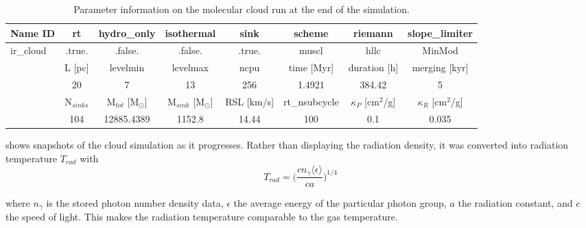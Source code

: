 \begin{table}[!htb]
\begin{adjustbox}{width=\textwidth}
\begin{tabular}{lccccccc}
\toprule
Name ID & rt & hydro\_only & isothermal & sink & scheme & riemann & slope\_limiter \\
\midrule
ir\_cloud & .true. & .false. & .false. & .true. & muscl & hllc & MinMod \\
\bottomrule
\toprule
\quad  & L [pc] & levelmin & levelmax & ncpu & time [Myr] & duration [h] & merging [kyr] \\
\midrule
\quad & 20 & 7 & 13 & 256 & 1.4921 & 384.42 & 5 \\
\bottomrule
\toprule
\quad & N$_{sinks}$ & M$_{tot}$ [M$_{\odot}$] & M$_{sink}$ [M$_{\odot}$] & RSL [km/s] & rt\_nsubcycle & $\kappa_{P}$ [cm$^{2}$/g] & $\kappa_{R}$ [cm$^{2}$/g] \\
\midrule
\quad & 104 & 12885.4389 & 1152.8 & 14.44 & 100 & 0.1 & 0.035 \\
\bottomrule
\end{tabular}
\end{adjustbox}
\captionsetup{justification=justified,singlelinecheck=false,width=\linewidth}
\caption[Cloud simulation parameter info]{Parameter information on the molecular cloud run at the end of the simulation.}
\label{tab:cloud}
\end{table}
\FloatBarrier

 shows snapshots of the cloud simulation as it progresses.
Rather than displaying the radiation density, it was converted into radiation temperature $T_{rad}$ with
\begin{equation}
  T_{rad} = \Big(\frac{c n_{\gamma} \langle \epsilon \rangle}{c a}\Big)^{1/4}
\end{equation}

where $n_{\gamma}$ is the stored photon number density data, $\epsilon$ the average energy of the particular photon group, $a$ the radiation constant, and $c$ the speed of light.
This makes the radiation temperature comparable to the gas temperature.


